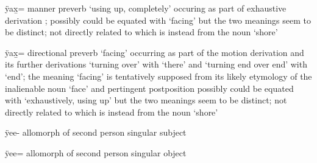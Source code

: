 \begin{morphdesc}[resume*=alphalist]
\item[ÿax̱=]\label{m:ÿax̱=exh}
	manner preverb ‘using up, completely’ occuring as part of exhaustive derivation
		;
	possibly could be equated with  ‘facing’
		but the two meanings seem to be distinct;
	not directly related to  which is instead from the noun  ‘shore’

\item[ÿax̱=]\label{m:ÿax̱=facing}
	directional preverb ‘facing’ occurring as part of the motion derivation
		and its further derivations  ‘turning over’ with  ‘there’
		and  ‘turning end over end’ with  ‘end’;
	the meaning ‘facing’ is tentatively supposed from its likely etymology of
		the inalienable noun  ‘face’ and pertingent postposition 
	possibly could be equated with  ‘exhaustively, using up’
		but the two meanings seem to be distinct;
	not directly related to  which is instead from the noun  ‘shore’

\item[ÿee-]
	allomorph of second person singular subject 

\item[ÿee=]
	allomorph of second person singular object 


\end{morphdesc}
